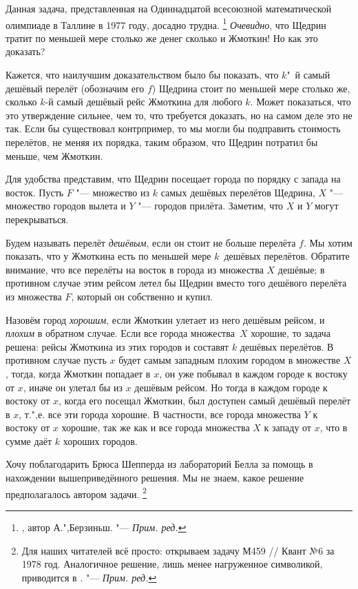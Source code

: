 \documentclass[twoside]{book}
\begin{document}
Данная задача, представленная на Одиннадцатой всесоюзной математической олимпиаде в Таллине в 1977 году, досадно трудна.%
\footnote{\cite[№240]{ВсМО}, автор  А.",Берзиньш. "--- \emph{Прим. ред.}}
\emph{Очевидно}, что Щедрин тратит по меньшей мере столько же денег сколько и Жмоткин!
Но как это доказать? %

\medskip

Кажется, что наилучшим доказательством было бы показать, что $k$"~й самый
дешёвый перелёт (обозначим его $f$) Щедрина стоит по меньшей мере столько же, сколько $k$-й самый дешёвый рейс Жмоткина для любого $k$.
Может показаться, что это утверждение сильнее, чем то, что требуется доказать, но на самом деле это не так.
Если бы существовал контрпример, то мы могли бы подправить стоимость перелётов, не меняя их порядка, таким образом, что Щедрин потратил бы меньше, чем Жмоткин.

Для удобства представим, что Щедрин посещает города по порядку с запада на восток.
Пусть $F$ "--- множество из $k$ самых дешёвых перелётов Щедрина, $X$ "--- множество городов вылета и $Y$ "--- городов прилёта.
Заметим, что $X$ и $Y$ могут перекрываться.

Будем называть перелёт \emph{дешёвым}, если он стоит не больше перелёта $f$.
Мы хотим показать, что у Жмоткина есть по меньшей мере $k$~дешёвых перелётов.
Обратите внимание, что все перелёты на восток в города из множества $X$ дешёвые; в противном случае этим рейсом летел бы Щедрин вместо того дешёвого перелёта из множества $F$, который он собственно и купил.

Назовём город \emph{хорошим}, если Жмоткин улетает из него дешёвым рейсом, и \emph{плохим} в обратном случае.
Если все города множества~$X$ хорошие, то задача решена: рейсы Жмоткина из этих городов и составят $k$ дешёвых перелётов.
В противном случае пусть $x$ будет самым западным плохим городом в множестве $X$, тогда, когда  Жмоткин попадает в $x$, он уже побывал в каждом городе к востоку от $x$, иначе он улетал бы из $x$ дешёвым рейсом.
Но тогда в каждом городе к востоку от $x$, когда его посещал Жмоткин, был доступен самый дешёвый перелёт в $x$, т.",е. все эти города хорошие.
В частности, все города множества $Y$ к востоку от $x$ хорошие, так же как и все города множества $X$ к западу от $x$, что в сумме даёт $k$ хороших городов.
\heart

Хочу поблагодарить Брюса Шепперда %
из лабораторий Белла %
за помощь в нахождении вышеприведённого решения.
Мы не знаем, какое решение предполагалось автором задачи.%
\footnote{Для наших читателей всё просто: открываем задачу М459 /\!/ Квант №6 за 1978 год.
Аналогичное решение, лишь менее нагруженное символикой, приводится в \cite[№240]{ВсМО}. "--- \emph{Прим. ред.} }
\end{document}
